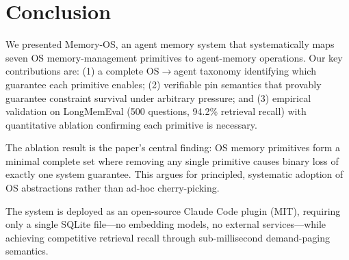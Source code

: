 \documentclass[10pt,twocolumn]{article}
\begin{document}
\section{Conclusion}
\label{sec:conclusion}

We presented Memory-OS, an agent memory system that systematically maps seven OS memory-management primitives to agent-memory operations. Our key contributions are: (1) a complete OS$\to$agent taxonomy identifying which guarantee each primitive enables; (2) verifiable pin semantics that provably guarantee constraint survival under arbitrary pressure; and (3) empirical validation on LongMemEval (500 questions, 94.2\% retrieval recall) with quantitative ablation confirming each primitive is necessary.

The ablation result is the paper's central finding: OS memory primitives form a minimal complete set where removing any single primitive causes binary loss of exactly one system guarantee. This argues for principled, systematic adoption of OS abstractions rather than ad-hoc cherry-picking.

The system is deployed as an open-source Claude Code plugin (MIT), requiring only a single SQLite file---no embedding models, no external services---while achieving competitive retrieval recall through sub-millisecond demand-paging semantics.



\end{document}
